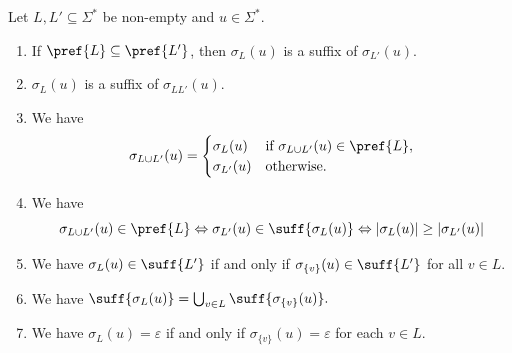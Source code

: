 \begin{proposition} \label{constr_sync:prop:sigma_L_prefix}
	Let $L, L' \subseteq \Sigma^*$ be non-empty and $u \in \Sigma^*$.
	\begin{enumerate}		
	\item \label{constr_sync:prop:sigma_L_prefix:2} If $\pref{L}\subseteq \pref{L'}$,
	then $\sigma_{L}(u)$ is a suffix of $\sigma_{L'}(u)$.
		
	\item \label{constr_sync:prop:sigma_L_prefix:3} $\sigma_{L}(u)$ is a suffix of $\sigma_{L L'}(u)$.	

	\item \label{constr_sync:prop:sigma_L_prefix:4a} We have
	\begin{equation} \label{constrsync:notions:eqn:sigmaL-union}
		\sigma_{L \cup L'}(u) 
		=
		\begin{cases}
			\sigma_{L}(u)  & \text{if } \sigma_{L \cup L'}(u)  \in \pref{L}, \\
			\sigma_{L'}(u) & \text{otherwise.}
		\end{cases}	
	\end{equation}
	
	\item \label{constr_sync:prop:sigma_L_prefix:4} We have
	\begin{equation}\label{constrsync:notions:eqn:LR-mapping-equiv-union}
	\sigma_{L \cup L'}(u)  \in \pref{L}
	\Leftrightarrow
	\sigma_{L'}(u) \in \suff{\sigma_L(u)}
	\Leftrightarrow
	|\sigma_L(u)| \ge |\sigma_{L'}(u)|
	\end{equation}

	\item \label{constr_sync:prop:sigma_L_prefix:5} We have
	$
	\sigma_L(u) \in \suff{L'}
	$
	if and only if $\sigma_{\{v\}}(u) \in \suff{L'}$ for all $v \in L$.
	
	\item \label{constr_sync:prop:sigma_L_prefix:6} We have
	$
	\suff{\sigma_L(u)} = \bigcup_{v \in L} \suff{\sigma_{\{v\}}(u)}. 
	$
	
	\item\label{constr_sync:prop:sigma_L_prefix:7}
	We have $\sigma_L(u) = \varepsilon$ if and only if $\sigma_{\{v\}}(u) = \varepsilon$ for each $v \in L$.
	\end{enumerate}
\end{proposition}
